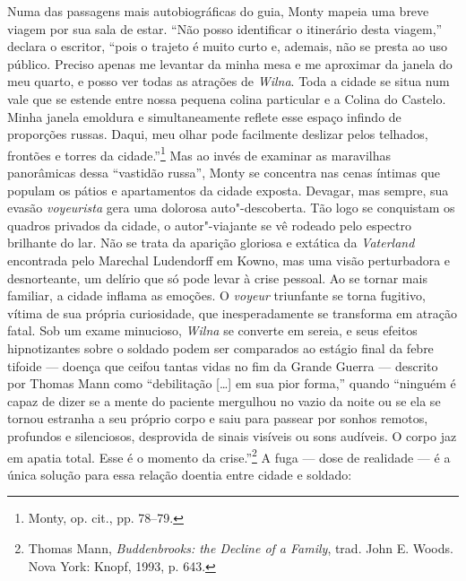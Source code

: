 Numa das passagens mais autobiográficas do guia, Monty mapeia uma breve
viagem por sua sala de estar. ``Não posso identificar o itinerário desta
viagem,'' declara o escritor, ``pois o trajeto é muito curto e, ademais,
não se presta ao uso público. Preciso apenas me levantar da minha mesa e
me aproximar da janela do meu quarto, e posso ver todas as atrações de
\textit{Wilna}. Toda a cidade se situa num vale que se estende entre nossa
pequena colina particular e a Colina do Castelo. Minha janela emoldura e
simultaneamente reflete esse espaço infindo de proporções russas. Daqui,
meu olhar pode facilmente deslizar pelos telhados, frontões e torres da
cidade.''\footnote{Monty, op. cit., pp. 78--79.} Mas ao invés de examinar
as maravilhas panorâmicas dessa ``vastidão russa'', Monty se concentra
nas cenas íntimas que populam os pátios e apartamentos da cidade
exposta. Devagar, mas sempre, sua evasão \textit{voyeurista} gera uma dolorosa
auto"-descoberta. Tão logo se conquistam os quadros privados da cidade, o
autor"-viajante se vê rodeado pelo espectro brilhante do lar. Não se
trata da aparição gloriosa e extática da \textit{Vaterland} encontrada
pelo Marechal Ludendorff em Kowno, mas uma visão perturbadora e
desnorteante, um delírio que só pode levar à crise pessoal. Ao se tornar
mais familiar, a cidade inflama as emoções. O \textit{voyeur} triunfante se torna
fugitivo, vítima de sua própria curiosidade, que inesperadamente se
transforma em atração fatal. Sob um exame minucioso, \textit{Wilna} se converte
em sereia, e seus efeitos hipnotizantes sobre o soldado podem ser
comparados ao estágio final da febre tifoide --- doença que ceifou tantas
vidas no fim da Grande Guerra --- descrito por Thomas Mann como
``debilitação [\ldots{}] em sua pior forma,'' quando ``ninguém é capaz de
dizer se a mente do paciente mergulhou no vazio da noite ou se ela se
tornou estranha a seu próprio corpo e saiu para passear por sonhos
remotos, profundos e silenciosos, desprovida de sinais visíveis ou sons
audíveis. O corpo jaz em apatia total. Esse é o momento da
crise.''\footnote{Thomas Mann, \textit{Buddenbrooks: the Decline of a Family}, trad. John E. Woods. Nova York: Knopf, 1993, p. 643.} A fuga --- dose de realidade --- é a única solução para essa relação doentia entre
cidade e soldado:

